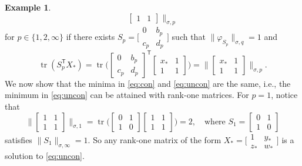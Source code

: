\documentclass[11pt,reqno]{amsart}
\newcommand{\tp}{{\scriptscriptstyle\mathsf{T}}}
\newcommand{\st}{\sigma}
\DeclareMathOperator{\tr}{tr}
\theoremstyle{definition}
\newtheorem{example}[theorem]{Example}
\numberwithin{equation}{section}
\begin{document}
\begin{example}
\begin{equation}
\begin{bmatrix}
    1 & 1
\end{bmatrix} \biggr\rVert_{\st, p}
\end{equation}
for $p \in \{1, 2,\infty\}$ if there exists $S_p = \bigl[\begin{smallmatrix}
    0 & b_p \\
c_p & d_p
\end{smallmatrix} \bigr]$ such that $\lVert \varphi_{S_p} \rVert_{\st, q}=1$ 
and 
\[
\tr(S_p^\tp X_*) = 
\tr\biggl(\begin{bmatrix}
    0 & b_p \\
c_p & d_p
\end{bmatrix}^\tp \begin{bmatrix}
    x_* &1\\ 1 &1
\end{bmatrix} \biggr) = \biggl\lVert \begin{bmatrix}
    x_* &1\\ 1 &1
\end{bmatrix} \biggr\rVert_{\st, p}.
\]
We now show that the minima in  \eqref{eq:con} and \eqref{eq:uncon} are the same, i.e., the minimum in \eqref{eq:uncon} can be attained with rank-one matrices. For $p=1$, notice that  
\[
    \biggl\lVert \begin{bmatrix}
        1 &1\\ 1 &1
    \end{bmatrix} \biggr\rVert_{\st,1} = \tr\biggl(\begin{bmatrix}
        0 &1\\
        1 &0
    \end{bmatrix} \begin{bmatrix}
        1 &1\\ 1 &1
    \end{bmatrix} \biggr) =2, \quad \text{where } S_1 = \begin{bmatrix}
        0 &1\\
         1 &0
     \end{bmatrix}
\]
satisfies $\lVert S_1\rVert_{\st,\infty} =1$. So any rank-one matrix of the form $X_*  = \bigl[\begin{smallmatrix}
1 & y_* \\
z_* & w_*
\end{smallmatrix} \bigr]$ is a solution to \eqref{eq:uncon}.


\end{example}
\end{document}
